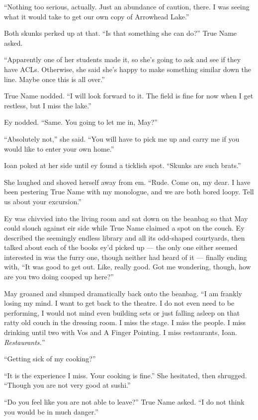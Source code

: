 ``Nothing too serious, actually. Just an abundance of caution, there. I was seeing what it would take to get our own copy of Arrowhead Lake.''

Both skunks perked up at that. ``Is that something she can do?'' True Name asked.

``Apparently one of her students made it, so she's going to ask and see if they have ACLs. Otherwise, she said she's happy to make something similar down the line. Maybe once this is all over.''

True Name nodded. ``I will look forward to it. The field is fine for now when I get restless, but I miss the lake.''

Ey nodded. ``Same. You going to let me in, May?''

``Absolutely not,'' she said. ``You will have to pick me up and carry me if you would like to enter your own home.''

Ioan poked at her side until ey found a ticklish spot. ``Skunks are such brats.''

She laughed and shoved herself away from em. ``Rude. Come on, my dear. I have been pestering True Name with my monologue, and we are both bored loopy. Tell us about your excursion.''

Ey was chivvied into the living room and sat down on the beanbag so that May could slouch against eir side while True Name claimed a spot on the couch. Ey described the seemingly endless library and all its odd-shaped courtyards, then talked about each of the books ey'd picked up — the only one either seemed interested in was the furry one, though neither had heard of it — finally ending with, ``It was good to get out. Like, really good. Got me wondering, though, how are you two doing cooped up here?''

May groaned and slumped dramatically back onto the beanbag. ``I am frankly losing my mind. I want to get back to the theatre. I do not even need to be performing, I would not mind even building sets or just falling asleep on that ratty old couch in the dressing room. I miss the stage. I miss the people. I miss drinking until two with Vos and A Finger Pointing. I miss restaurants, Ioan. \emph{Restaurants.}''

``Getting sick of my cooking?''

``It is the experience I miss. Your cooking is fine.'' She hesitated, then shrugged. ``Though you are not very good at sushi.''

``Do you feel like you are not able to leave?'' True Name asked. ``I do not think you would be in much danger.''


